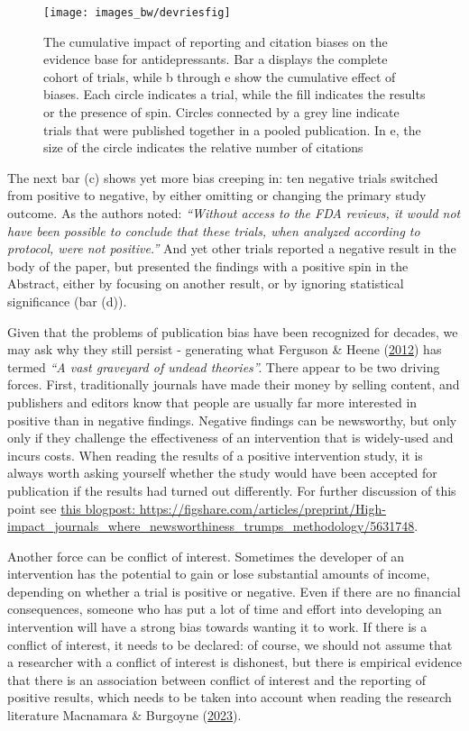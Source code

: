 \documentclass{krantz}
\begin{document}
\begin{figure}
\texttt{[image: images\_bw/devriesfig]} \caption{The cumulative impact of reporting and citation biases on the evidence base for antidepressants. Bar a displays the complete cohort of trials, while b through e show the cumulative effect of biases. Each circle indicates a trial, while the fill indicates the results or the presence of spin. Circles connected by a grey line indicate trials that were published together in a pooled publication. In e, the size of the circle indicates the relative number of citations}\label{fig:devriesfig}
\end{figure}

The next bar (c) shows yet more bias creeping in: ten negative trials switched from positive to negative, by either omitting or changing the primary study outcome. As the authors noted: \emph{``Without access to the FDA reviews, it would not have been possible to conclude that these trials, when analyzed according to protocol, were not positive.''} And yet other trials reported a negative result in the body of the paper, but presented the findings with a positive spin in the Abstract, either by focusing on another result, or by ignoring statistical significance (bar (d)).

Given that the problems of publication bias have been recognized for decades, we may ask why they still persist - generating what Ferguson \& Heene (\protect\hyperlink{ref-ferguson2012}{2012}) has termed \emph{``A vast graveyard of undead theories''.} There appear to be two driving forces. First, traditionally journals have made their money by selling content, and publishers and editors know that people are usually far more interested in positive than in negative findings. Negative findings can be newsworthy, but only only if they challenge the effectiveness of an intervention that is widely-used and incurs costs. When reading the results of a positive intervention study, it is always worth asking yourself whether the study would have been accepted for publication if the results had turned out differently. For further discussion of this point see \href{https://figshare.com/articles/preprint/High-impact_journals_where_newsworthiness_trumps_methodology/5631748}{this blogpost: https://figshare.com/articles/preprint/High-impact\_journals\_where\_newsworthiness\_trumps\_methodology/5631748}.

Another force can be conflict of interest. Sometimes the developer of an intervention has the potential to gain or lose substantial amounts of income, depending on whether a trial is positive or negative. Even if there are no financial consequences, someone who has put a lot of time and effort into developing an intervention will have a strong bias towards wanting it to work. If there is a conflict of interest, it needs to be declared: of course, we should not assume that a researcher with a conflict of interest is dishonest, but there is empirical evidence that there is an association between conflict of interest and the reporting of positive results, which needs to be taken into account when reading the research literature Macnamara \& Burgoyne (\protect\hyperlink{ref-macnamara2023}{2023}).
\end{document}
